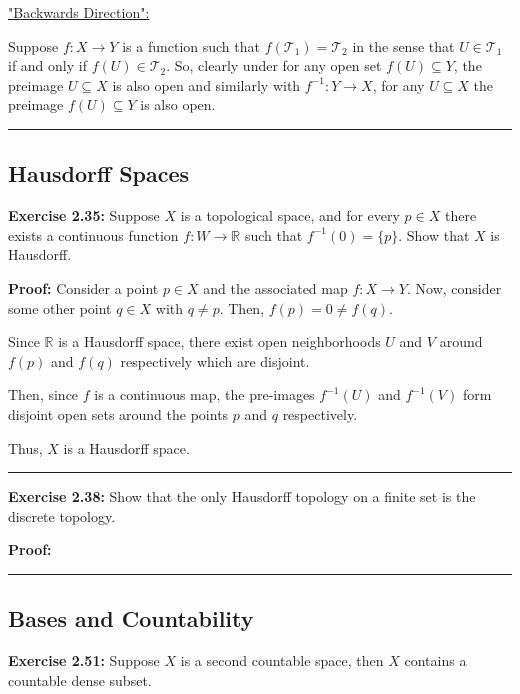 \documentclass{article}
\newcommand*{\T}{\mathcal T}
\begin{document}
\vskip 0.5cm

\underline{"Backwards Direction":}

Suppose $f : X \rightarrow Y$ is a function such that $f(\T_1) = \T_2$ in the sense that $U \in \T_1$ if and only if $f(U) \in \T_2$. So, clearly under for any open set $f(U) \subseteq Y$, the preimage $U \subseteq X$ is also open and similarly with $f^{-1} : Y \rightarrow X$, for any $U \subseteq X$ the preimage $f(U) \subseteq Y$ is also open.

\vskip 0.5cm
\hrule
\vskip 0.5cm

\subsection{Hausdorff Spaces}

\textbf{Exercise 2.35:} Suppose $X$ is a topological space, and for every $p \in X$ there exists a continuous function $f : W \rightarrow \mathbb{R}$ such that $f^{-1}(0) = \{ p \}$. Show that $X$ is Hausdorff.

\vskip 0.5cm

\textbf{Proof:} Consider a point $p \in X$ and the associated map $f : X \rightarrow Y$. Now, consider some other point $q \in X$ with $q \neq p$. Then, $f(p) = 0 \neq f(q)$.

Since $\mathbb{R}$ is a Hausdorff space, there exist open neighborhoods $U$ and $V$ around $f(p)$ and $f(q)$ respectively which are disjoint. 

Then, since $f$ is a continuous map, the pre-images $f^{-1}(U)$ and $f^{-1}(V)$ form disjoint open sets around the points $p$ and $q$ respectively.

Thus, $X$ is a Hausdorff space.

\vskip 0.5cm
\hrule
\vskip 0.5cm

\textbf{Exercise 2.38:} Show that the only Hausdorff topology on a finite set is the discrete topology. 

\vskip 0.5cm

\textbf{Proof:} 

\vskip 0.5cm
\hrule
\vskip 0.5cm

\subsection{Bases and Countability}

\textbf{Exercise 2.51:} Suppose $X$ is a second countable space, then $X$ contains a countable dense subset.

\vskip 0.5cm
\end{document}
